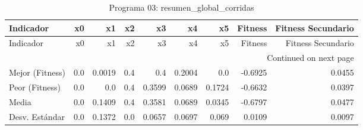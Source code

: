 \begin{longtable}{lrrrrrrrr}
\caption{Programa 03: resumen\_global\_corridas}\label{tab:resumen_global_corridas} \\
\toprule
Indicador & x0 & x1 & x2 & x3 & x4 & x5 & Fitness & Fitness Secundario \\
\midrule
\endfirsthead
\toprule
Indicador & x0 & x1 & x2 & x3 & x4 & x5 & Fitness & Fitness Secundario \\
\midrule
\endhead
\midrule
\multicolumn{9}{r}{Continued on next page} \\
\midrule
\endfoot
\bottomrule
\endlastfoot
Mejor (Fitness) & 0.0 & 0.0019 & 0.4 & 0.4 & 0.2004 & 0.0 & -0.6925 & 0.0455 \\
Peor (Fitness) & 0.0 & 0.0 & 0.4 & 0.3599 & 0.0689 & 0.1724 & -0.6632 & 0.0397 \\
Media & 0.0 & 0.1409 & 0.4 & 0.3581 & 0.0689 & 0.0345 & -0.6797 & 0.0477 \\
Desv. Estándar & 0.0 & 0.1372 & 0.0 & 0.0657 & 0.0697 & 0.069 & 0.0109 & 0.0097 \\
\end{longtable}